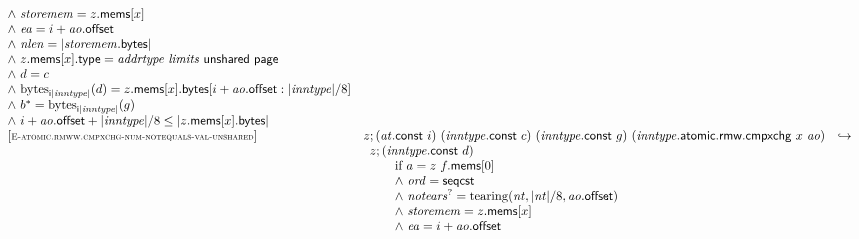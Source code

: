 $$\begin{array}[t]{@{}lrcl@{}l@{}}
{\begin{array}[t]{@{}l@{}l@{}l@{}}
{\begin{array}[t]{@{}l@{}}
\begin{array}[t]{@{}l@{}}
{\land}~ {\mathit{storemem}} = z{.}\mathsf{mems}{}[x] \\
{\land}~ {\mathit{ea}} = i + {\mathit{ao}}{.}\mathsf{offset} \\
{\land}~ {\mathit{nlen}} = {|{\mathit{storemem}}{.}\mathsf{bytes}|} \\
{\land}~ z{.}\mathsf{mems}{}[x]{.}\mathsf{type} = {\mathit{addrtype}}~{\mathit{limits}}~\mathsf{unshared}~\mathsf{page} \\
{\land}~ d = c \\
{\land}~ {{\mathrm{bytes}}}_{{\mathsf{i}}{{|{\mathit{inntype}}|}}}(d) = z{.}\mathsf{mems}{}[x]{.}\mathsf{bytes}{}[i + {\mathit{ao}}{.}\mathsf{offset} : {|{\mathit{inntype}}|} / 8] \\
{\land}~ {b^\ast} = {{\mathrm{bytes}}}_{{\mathsf{i}}{{|{\mathit{inntype}}|}}}(g) \\
{\land}~ i + {\mathit{ao}}{.}\mathsf{offset} + {|{\mathit{inntype}}|} / 8 \leq {|z{.}\mathsf{mems}{}[x]{.}\mathsf{bytes}|} \\
\end{array} \\
\end{array}
} \\
\end{array}
} \\
{[\textsc{\scriptsize E{-}atomic.rmww.cmpxchg{-}num{-}notequals{-}val{-}unshared}]} \quad & z ; ({\mathit{at}}{.}\mathsf{const}~i)~({\mathit{inntype}}{.}\mathsf{const}~c)~({\mathit{inntype}}{.}\mathsf{const}~g)~({\mathit{inntype}}{.}\mathsf{atomic}{.}\mathsf{rmw}{.}\mathsf{cmpxchg}~x~{\mathit{ao}}) & \hookrightarrow & & \\
& \multicolumn{4}{@{}l@{}}{\quad
\begin{array}[t]{@{}l@{}l@{}l@{}}
z ; ({\mathit{inntype}}{.}\mathsf{const}~d) & & \\
 \multicolumn{3}{@{}l@{}}{\quad
\begin{array}[t]{@{}l@{}}
\quad
\begin{array}[t]{@{}l@{}}
\mbox{if}~ a = z~f{.}\mathsf{mems}{}[0] \\
{\land}~ {\mathit{ord}} = \mathsf{seqcst} \\
{\land}~ {{\mathit{notears}}^?} = {\mathrm{tearing}}({\mathit{nt}}, {|{\mathit{nt}}|} / 8, {\mathit{ao}}{.}\mathsf{offset}) \\
{\land}~ {\mathit{storemem}} = z{.}\mathsf{mems}{}[x] \\
{\land}~ {\mathit{ea}} = i + {\mathit{ao}}{.}\mathsf{offset} \\

\end{array}
\end{array}}
\end{array}}
\end{array}$$
